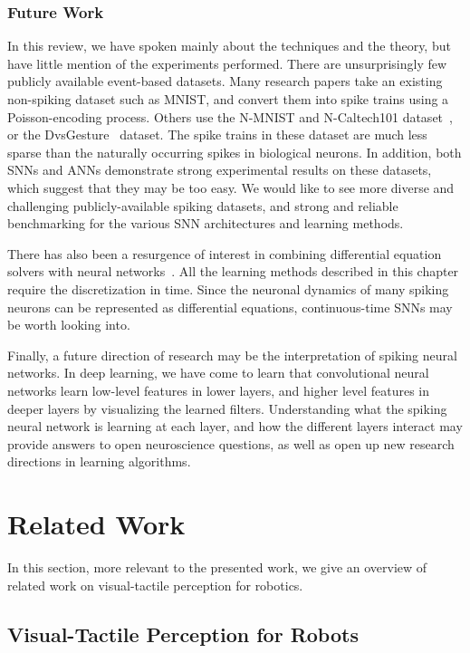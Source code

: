 \documentclass[fyp]{socreport}
\begin{document}
\subsection{Future Work}

In this review, we have spoken mainly about the techniques and the theory, but
have little mention of the experiments performed. There are unsurprisingly few
publicly available event-based datasets. Many research papers take an existing
non-spiking dataset such as MNIST, and convert them into spike trains using a
Poisson-encoding process. Others use the N-MNIST and N-Caltech101
dataset~\cite{orchard15_conver_static_image_datas_to}, or the
DvsGesture~\cite{dvsgesture} dataset. The spike trains in these dataset are much
less sparse than the naturally occurring spikes in biological neurons. In
addition, both SNNs and ANNs demonstrate strong experimental results on these
datasets, which suggest that they may be too easy. We would like to see more
diverse and challenging publicly-available spiking datasets, and strong and
reliable benchmarking for the various SNN architectures and learning methods.

There has also been a resurgence of interest in combining differential equation
solvers with neural networks~\cite{NIPS2018_7892}. All the learning methods
described in this chapter require the discretization in time. Since the neuronal
dynamics of many spiking neurons can be represented as differential equations,
continuous-time SNNs may be worth looking into.

Finally, a future direction of research may be the interpretation of spiking
neural networks. In deep learning, we have come to learn that convolutional
neural networks learn low-level features in lower layers, and higher level
features in deeper layers by visualizing the learned filters. Understanding what
the spiking neural network is learning at each layer, and how the different
layers interact may provide answers to open neuroscience questions, as well as
open up new research directions in learning algorithms.

\chapter{Related Work\label{cha:related}}

In this section, more relevant to the presented work, we give an overview of
related work on visual-tactile perception for robotics.

\section{Visual-Tactile Perception for Robots}
\end{document}
